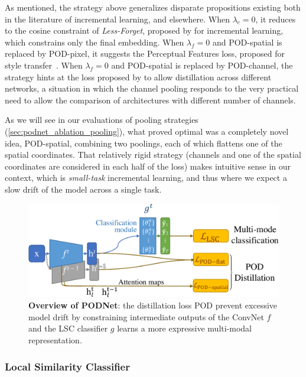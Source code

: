 As mentioned, the strategy above generalizes disparate propositions existing both in the literature
of incremental learning, and elsewhere. When $\lambda_{c}=0$, it reduces to the cosine constraint of
\textit{Less-Forget}, proposed by \cite{hou2019ucir} for incremental learning, which constrains only
the final embedding. When $\lambda_{f}=0$ and POD-spatial is replaced by POD-pixel, it suggests the
Perceptual Features loss, proposed for style transfer~\citep{johnson2016perceptual_losses}. When
$\lambda_{f}=0$ and POD-spatial is replaced by POD-channel, the strategy hints at the loss proposed
by \cite{zagoruyko2016distillation_attention} to allow distillation across different networks, a
situation in which the channel pooling responds to the very practical need to allow the comparison
of architectures with different number of channels.

As we will see in our evaluations of pooling strategies (\autoref{sec:podnet_ablation_pooling}),
what proved optimal was a completely novel idea, POD-spatial, combining two poolings, each of which
flattens one of the spatial coordinates. That relatively rigid strategy (channels and one of the
spatial coordinates are considered in each half of the loss) makes intuitive sense in our context,
which is \textit{small-task} incremental learning, and thus where we expect a slow drift of the
model across a single task.


\begin{figure}[t]
    \begin{center}
        \includegraphics[width=0.8\linewidth]{images/podnet/model}
    \end{center}
    \caption{\textbf{Overview of PODNet}: the distillation loss \ac{POD} prevent excessive model
        drift by constraining intermediate outputs of the \ac{ConvNet} $f$ and the \ac{LSC}
        classifier $g$ learns a more expressive multi-modal representation.}
    \label{fig:podnet_model}
\end{figure}

\subsubsection{Local Similarity Classifier}
\label{sec:podnet_local_classifier}


